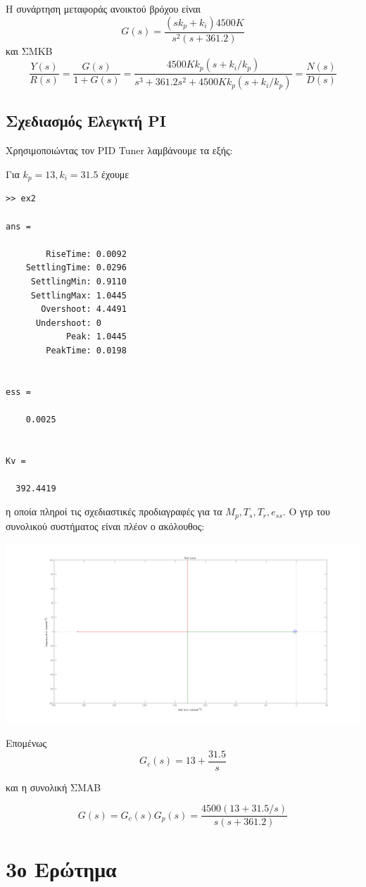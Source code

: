\documentclass[a4paper,oneside, 10pt]{article}
\begin{document}
Η συνάρτηση μεταφοράς ανοικτού βρόχου είναι $$G(s) = \frac { (sk_p + k_i)4500K  } {s^2 (s + 361.2)} $$ και ΣΜΚΒ $$\frac {Y(s)} {R(s)}= \frac {G(s)} {1 + G(s)} = \frac { 4500Kk_p ( s + k_i / k_p )   } {  s^3 + 361.2s^2 + 4500Kk_p (s + k_i / k_p) } = \frac {N(s)}{D(s)}$$

\subsection*{Σχεδιασμός Ελεγκτή PI}
Χρησιμοποιώντας τον PID Tuner λαμβάνουμε τα εξής:

Για $k_p = 13, k_i = 31.5$ έχουμε 

\begin{verbatim}
>> ex2

ans = 

        RiseTime: 0.0092
    SettlingTime: 0.0296
     SettlingMin: 0.9110
     SettlingMax: 1.0445
       Overshoot: 4.4491
      Undershoot: 0
            Peak: 1.0445
        PeakTime: 0.0198


ess =

    0.0025


Kv =

  392.4419
\end{verbatim}  

η οποία πληροί τις σχεδιαστικές προδιαγραφές για τα $M_p, T_s, T_r, e_{ss}$. Ο γτρ του συνολικού συστήματος είναι πλέον ο ακόλουθος:

 \includegraphics[width=\textwidth]{pi_rlocus.png}

Επομένως $$G_c(s) = 13 + \frac {31.5} s$$

και η συνολική ΣΜΑΒ

$$G(s) = G_c(s) G_p(s) = \frac {4500(13 + 31.5 / s)}  {s (s + 361.2)}$$



\section*{3ο Ερώτημα} 
\end{document}
